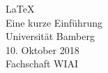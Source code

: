 \begin{center}
\Huge \LaTeX\\
\vspace{5mm} \LARGE Eine kurze Einführung\\
\vspace{12mm} \Large  Universität Bamberg\\[5mm]
\large 10. Oktober 2018\\
Fachschaft WIAI\normalsize \\
\end{center}
